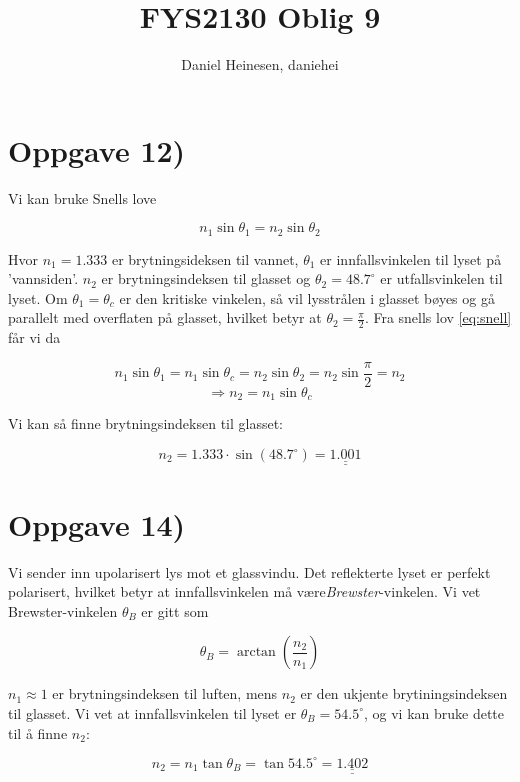 \documentclass[a4paper,norsk, 10pt]{article}
\title{FYS2130 Oblig 9}
\author{Daniel Heinesen, daniehei}
\begin{document}
\maketitle

\section*{Oppgave 12)}
Vi kan bruke Snells love

\begin{equation}
n_1 \sin \theta_1 = n_2 \sin\theta_2
\label{eq:snell}
\end{equation}

Hvor $n_1 = 1.333$ er brytningsideksen til vannet, $\theta_1$ er innfallsvinkelen til lyset på 'vannsiden'. $n_2$ er brytningsindeksen til glasset og $\theta_2 = 48.7^{\circ}$ er utfallsvinkelen til lyset. Om $\theta_1 = \theta_c$ er den kritiske vinkelen, så vil lysstrålen i glasset bøyes og gå parallelt med overflaten på glasset, hvilket betyr at $\theta_2 = \frac{\pi}{2}$. Fra snells lov \eqref{eq:snell} får vi da

$$
n_1 \sin \theta_1 = n_1 \sin \theta_c = n_2 \sin\theta_2 = n_2 \sin\frac{\pi}{2} = n_2
$$
$$
\Rightarrow n_2 = n_1 \sin \theta_c
$$

Vi kan så finne brytningsindeksen til glasset:

\begin{equation}
n_2 = 1.333\cdot\sin(48.7^{\circ}) = \underline{\underline{1.001}}
\end{equation}

\section*{Oppgave 14)}

Vi sender inn upolarisert lys mot et glassvindu. Det reflekterte lyset er perfekt polarisert, hvilket betyr at innfallsvinkelen må være\textit{Brewster}-vinkelen. Vi vet Brewster-vinkelen $\theta_B$ er gitt som

\begin{equation}
\theta_B = \arctan\left(\frac{n_2}{n_1}\right)
\label{eq:brewster}
\end{equation}

$n_1 \approx 1$ er brytningsindeksen til luften, mens $n_2$ er den ukjente brytiningsindeksen til glasset. Vi vet at innfallsvinkelen til lyset er $\theta_B = 54.5^{\circ}$, og vi kan bruke dette til å finne $n_2$:

$$
n_2 = n_1\tan \theta_B = \tan 54.5^{\circ} = \underline{\underline{1.402}}
$$
\end{document}
